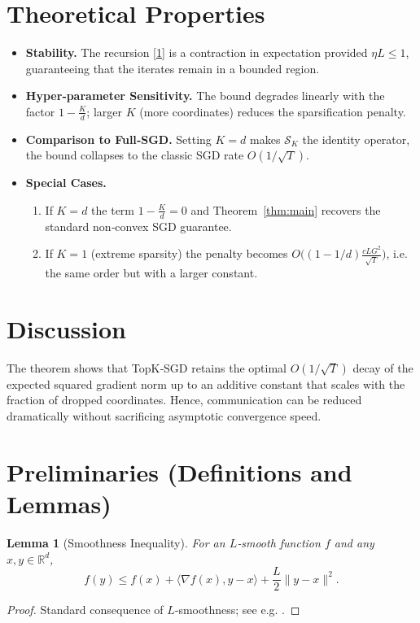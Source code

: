 \documentclass{article}
\newtheorem{lemma}{Lemma}
\newcommand{\R}{\mathbb{R}}
\newcommand{\topk}{\mathcal{S}_K}
\begin{document}
\section*{Theoretical Properties}
\begin{itemize}
\item \textbf{Stability.} The recursion \eqref{1} is a contraction in expectation provided $\eta L\le1$, guaranteeing that the iterates remain in a bounded region.
\item \textbf{Hyper‑parameter Sensitivity.} The bound degrades linearly with the factor $1-\frac{K}{d}$; larger $K$ (more coordinates) reduces the sparsification penalty.
\item \textbf{Comparison to Full‑SGD.} Setting $K=d$ makes $\topk$ the identity operator, the bound collapses to the classic SGD rate $O(1/\sqrt{T})$.
\item \textbf{Special Cases.}
    \begin{enumerate}
        \item If $K=d$ the term $1-\frac{K}{d}=0$ and Theorem~\ref{thm:main} recovers the standard non‑convex SGD guarantee.
        \item If $K=1$ (extreme sparsity) the penalty becomes $O\big((1-1/d) \frac{cLG^{2}}{\sqrt{T}}\big)$, i.e. the same order but with a larger constant.
    \end{enumerate}
\end{itemize}

\section*{Discussion}
The theorem shows that TopK‑SGD retains the optimal $O(1/\sqrt{T})$ decay of the expected squared gradient norm up to an additive constant that scales with the fraction of dropped coordinates. Hence, communication can be reduced dramatically without sacrificing asymptotic convergence speed.

\newpage

\section*{Preliminaries (Definitions and Lemmas)}
\begin{lemma}[Smoothness Inequality]\label{lem:smooth}
For an $L$‑smooth function $f$ and any $x,y\in\R^{d}$,
\[
f(y)\le f(x)+\langle\nabla f(x),y-x\rangle+\frac{L}{2}\|y-x\|^{2}.
\]
\end{lemma}
\begin{proof}
Standard consequence of $L$‑smoothness; see e.g. \cite{Nesterov2004}.
\end{proof}
\end{document}
